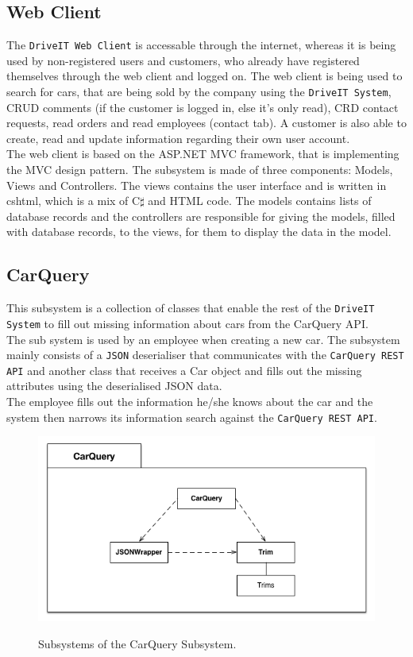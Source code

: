 \subsection{Web Client}
The \texttt{DriveIT Web Client} is accessable through the internet, whereas it is being used by non-registered users and customers, who already have registered themselves through the web client and logged on. The web client is being used to search for cars, that are being sold by the company using the \texttt{DriveIT System}, CRUD comments (if the customer is logged in, else it's only read), CRD contact requests, read orders and read employees (contact tab). A customer is also able to create, read and update information regarding their own user account.\\
The web client is based on the ASP.NET MVC framework, that is implementing the MVC design pattern. The subsystem is made of three components: Models, Views and Controllers. The views contains the user interface and is written in cshtml, which is a mix of C$\sharp$ and HTML code. The models contains lists of database records and the controllers are responsible for giving the models, filled with database records, to the views, for them to display the data in the model.

\subsection{CarQuery} 
This subsystem is a collection of classes that enable the rest of the \texttt{DriveIT System} to fill out missing information about cars from the CarQuery API.\\
The sub system is used by an employee when creating a new car. The subsystem mainly consists of a \texttt{JSON} deserialiser that communicates with the \texttt{CarQuery REST API} and another class that receives a Car object and fills out the missing attributes using the deserialised JSON data. \\
The employee fills out the information he/she knows about the car and the system then narrows its information search against the \texttt{CarQuery REST API}.
\begin{figure}[H]
	\centering
	\includegraphics[width=\textwidth]{Figures/CarQuerySubsystemDecomposition}\\
	\caption{Subsystems of the CarQuery Subsystem.}
\end{figure}